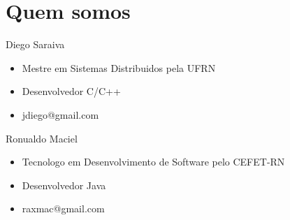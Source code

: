 \section{Quem somos}

\begin{frame}
	\begin{block}{Diego Saraiva}
		\begin{itemize}
		  \item Mestre em Sistemas Distribuidos pela UFRN
		  \item Desenvolvedor C/C++
		  \item jdiego@gmail.com
		\end{itemize}
	\end{block}
	
	\begin{block}{Ronualdo Maciel}
		\begin{itemize}
			\item Tecnologo em Desenvolvimento de Software pelo CEFET-RN
			\item Desenvolvedor Java
			\item raxmac@gmail.com
		\end{itemize}
	\end{block}
\end{frame}